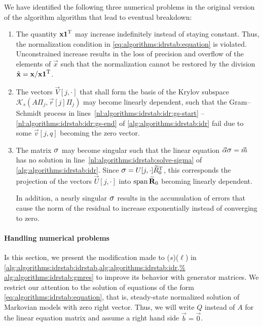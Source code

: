 We have identified the following three numerical problems in the
original version of the algorithm algorithm that lead to eventual
breakdown:
\begin{enumerate}
\item The quantity $\bm{\mathrm{x}} \bm{\mathrm{1}}^{\mathrm{T}}$ may increase indefinitely
  instead of staying constant. Thus, the normalization condition in
  \cref{eq:algorithms:idrstab:equation} is violated. Unconstrained
  increase results in the loss of precision and overflow of the
  elements of $\vec{x}$ such that the normalization cannot be restored
  by the division $\hat{\bm{\mathrm{x}}} = \bm{\mathrm{x}} / \bm{\mathrm{x}} \bm{\mathrm{1}}^{\mathrm{T}}$.
\item The vectors $\vec{V}[j, \cdot]$ that shall form the basis of the
  Krylov subspace $\mathcal{K}_s(A \Pi_j, \vec{r}[j] \Pi_j)$ may
  become linearly dependent, such that the Gram--Schmidt process in
  lines~\ref{nl:algorithms:idrstab:idr:gs-start}%
  --\ref{nl:algorithms:idrstab:idr:gs-end} of
  \cref{alg:algorithms:idrstab:idr} fail due to some $\vec{v}[j, q]$
  becoming the zero vector.
\item The matrix $\largesigma$ may become singular such that the
  linear equation $\vecarrow{\alpha} \largesigma = \vecarrow{m}$ has
  no solution in line~\ref{nl:algorithms:idrstab:solve-sigma} of
  \cref{alg:algorithms:idrstab:idr}. Since
  $\largesigma = U[j, \cdot] \widetilde{R}_0^\T$, this corresponds the
  projection of the vectors $\vec{U}[j, \cdot]$ into
  $\operatorname{span} \widetilde{\bm{\mathrm{R}}}_0$ becoming linearly dependent.

  In addition, a nearly singular $\largesigma$ results in the
  accumulation of errors that cause the norm of the residual to
  increase exponentially instead of converging to zero.
\end{enumerate}

\paragraph{Handling numerical problems}

Is this section, we present the modification made to
($s$)($\ell$) in
\cref{alg:algorithms:idrstab:idrstab,alg:algorithms:idrstab:idr,%
  alg:algorithms:idrstab:gmres} to improve its behavior with
 generator matrices. We restrict our attention to the
solution of equations of the form
\eqref{eq:algorithms:idrstab:equation}, that is, steady-state
normalized solution of Markovian models with zero right vector. Thus,
we will write $Q$ instead of $A$ for the linear equation matrix and
assume a right hand side $\vec{b} = \vec{0}$.

